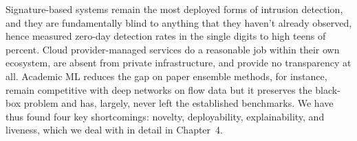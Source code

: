 Signature-based systems remain the most deployed forms of intrusion detection, and they are fundamentally blind to anything that they haven't already observed, hence measured zero-day detection rates in the single digits to high teens of percent. Cloud provider-managed services do a reasonable job within their own ecosystem, are absent from private infrastructure, and provide no transparency at all. Academic ML reduces the gap on paper ensemble methods, for instance, remain competitive with deep networks on flow data but it preserves the black-box problem and has, largely, never left the established benchmarks. We have thus found four key shortcomings: novelty, deployability, explainability, and liveness, which we deal with in detail in Chapter~4.
